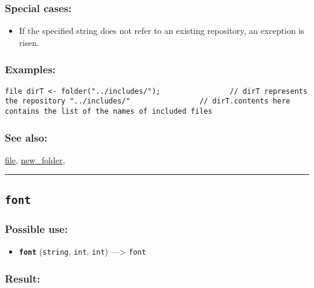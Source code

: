 \documentclass[]{book}
\providecommand{\tightlist}{%
  \setlength{\itemsep}{0pt}\setlength{\parskip}{0pt}}
\theoremstyle{definition}
\theoremstyle{definition}
\theoremstyle{definition}
\theoremstyle{remark}
\begin{document}
\subsubsection{Special cases:}\label{special-cases-64}

\begin{itemize}
\tightlist
\item
  If the specified string does not refer to an existing repository, an
  exception is risen.
\end{itemize}

\subsubsection{Examples:}\label{examples-127}

\begin{verbatim}
file dirT <- folder("../includes/");                // dirT represents the repository "../includes/"                // dirT.contents here contains the list of the names of included files 
\end{verbatim}

\subsubsection{See also:}\label{see-also-98}

\href{OperatorsDH\#file}{file},
\href{OperatorsNR\#new_folder}{new\_folder},

\begin{center}\rule{0.5\linewidth}{\linethickness}\end{center}

\subsection{\texorpdfstring{\texttt{font}}{font}}\label{font}

\subsubsection{Possible use:}\label{possible-use-173}

\begin{itemize}
\tightlist
\item
  \textbf{\texttt{font}} (\texttt{string}, \texttt{int}, \texttt{int})
  ---\textgreater{} \texttt{font}
\end{itemize}

\subsubsection{Result:}\label{result-167}
\end{document}
